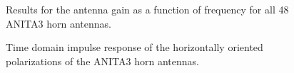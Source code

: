 \begin{figure}
\centering
{}
	\caption{Results for the antenna gain as a function of frequency for all 48 ANITA3 horn antennas.}
\label{fig:antennaGain}
\end{figure}

\begin{figure}
\centering
{}
	\caption{Time domain impulse response of the horizontally oriented polarizations of the ANITA3 horn antennas.}
\label{fig:antResponse_timeH}
\end{figure}


